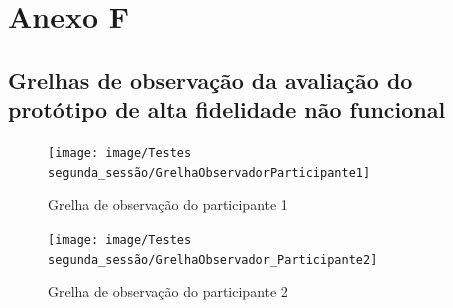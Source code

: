 \documentclass[11pt, twoside]{report}
\begin{document}
	\chapter*{Anexo F}
		\section*{Grelhas de observação da avaliação do protótipo de alta fidelidade não funcional}
		\begin{landscape}
			\clearpage
			\pagestyle{empty}
			
			\begin{figure}[H] 
				\centering 							\texttt{[image: image/Testes segunda\_sessão/GrelhaObservadorParticipante1]}
				\caption{Grelha de observação do participante 1}
				
			\end{figure}
			\begin{figure}[H] 
				\centering 							\texttt{[image: image/Testes segunda\_sessão/GrelhaObservador\_Participante2]}
				\caption{Grelha de observação do participante 2}
			\end{figure}
			
			
			\end{landscape}
	
\end{document}
